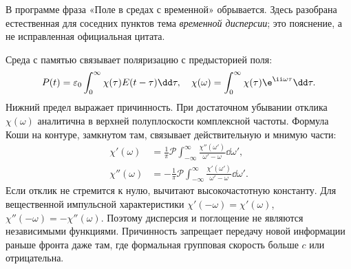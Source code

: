 
В программе фраза «Поле в средах с временной» обрывается. Здесь разобрана естественная для соседних пунктов тема \emph{временной дисперсии}; это пояснение, а не исправленная официальная цитата.

Среда с памятью связывает поляризацию с предысторией поля:
\begin{equation}
 P(t)=\varepsilon_0\int_0^\infty\chi(\tau)E(t-\tau)\dd\tau,\quad
 \chi(\omega)=\int_0^\infty\chi(\tau)\e^{\ii\omega\tau}\dd\tau.
\end{equation}
Нижний предел выражает причинность. При достаточном убывании отклика $\chi(\omega)$ аналитична в верхней полуплоскости комплексной частоты. Формула Коши на контуре, замкнутом там, связывает действительную и мнимую части:
\begin{align}
 \chi'(\omega)&=\frac1\pi\mathcal P\int_{-\infty}^{\infty}
 \frac{\chi''(\omega')}{\omega'-\omega}\dd\omega',\\
 \chi''(\omega)&=-\frac1\pi\mathcal P\int_{-\infty}^{\infty}
 \frac{\chi'(\omega')}{\omega'-\omega}\dd\omega'.
\end{align}
Если отклик не стремится к нулю, вычитают высокочастотную константу. Для вещественной импульсной характеристики $\chi'(-\omega)=\chi'(\omega)$, $\chi''(-\omega)=-\chi''(\omega)$. Поэтому дисперсия и поглощение не являются независимыми функциями. Причинность запрещает передачу новой информации раньше фронта даже там, где формальная групповая скорость больше $c$ или отрицательна.
